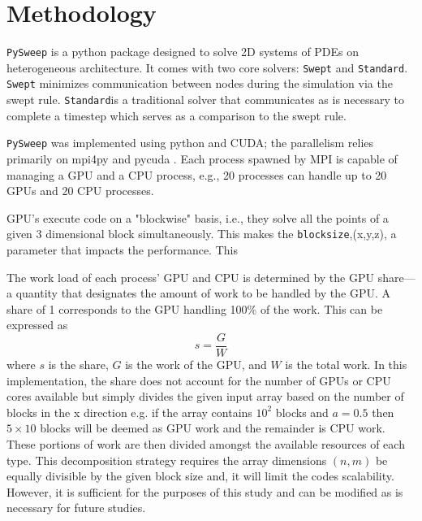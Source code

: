 \documentclass[review]{elsarticle}
\def\pysweep{\texttt{PySweep}}
\def\Swept{\texttt{Swept}}
\def\Standard{\texttt{Standard}}
\begin{document}
%
%

\section{Methodology}

\pysweep{} is a python package designed to solve 2D systems of PDEs on heterogeneous architecture. It comes with two core solvers: \Swept{} and \Standard{}. \Swept{} minimizes communication between nodes during the simulation via the swept rule. \Standard is a traditional solver that communicates as is necessary to complete a timestep which serves as a comparison to the swept rule.

\par
\pysweep{} was implemented using python and CUDA; the parallelism relies primarily on mpi4py and pycuda \cite{DalcinMPIPython, KlocknerPyCUDAGeneration}. Each process spawned by MPI is capable of managing a GPU and a CPU process, e.g., 20 processes can handle up to 20 GPUs and 20 CPU processes. 

\par
GPU's execute code on a "blockwise" basis, i.e., they solve all the points of a given 3 dimensional block simultaneously. This makes the \texttt{blocksize},(x,y,z), a parameter that impacts the performance. This

\par
The work load of each process' GPU and CPU is determined by the GPU share---a quantity that designates the amount of work to be handled by the GPU. A share of 1 corresponds to the GPU handling 100\% of the work. This can be expressed as
\begin{equation}
    s = \frac{G}{W}
\end{equation}
where $s$ is the share, $G$ is the work of the GPU, and $W$ is the total work. In this implementation, the share does not account for the number of GPUs or CPU cores available but simply divides the given input array based on the number of blocks in the x direction e.g. if the array contains $10^2$ blocks and $a=0.5$ then $5\times10$ blocks will be deemed as GPU work and the remainder is CPU work. These portions of work are then divided amongst the available resources of each type. This decomposition strategy requires the array dimensions $(n, m)$ be equally divisible by the given block size and, it will limit the codes scalability. However, it is sufficient for the purposes of this study and can be modified as is necessary for future studies. 
\end{document}
